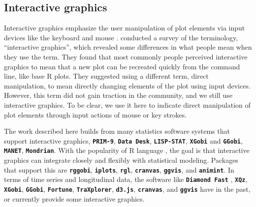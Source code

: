 \documentclass[12pt]{article}
\begin{document}
\begin{enumerate}
\end{enumerate}

\subsection{Interactive graphics\label{sec:interactive-graphics}}

Interactive graphics emphasize the user manipulation of plot elements via input devices like the keyboard and mouse \citep{symanzik2012interactive}. \citet{swayne1999} conducted a survey of the terminology, ``interactive graphics'', which revealed some differences in what people mean when they use the term. They found that most commonly people perceived interactive graphics to mean that a new plot can be recreated quickly from the command line, like base R plots. They suggested using a different term, direct manipulation, to mean directly changing elements of the plot using input devices. However, this term did not gain traction in the community, and we still use interactive graphics. To be clear, we use it here to indicate direct manipulation of plot elements through input actions of mouse or key strokes. 

The work described here builds from many statistics software systems that support interactive graphics, 
\texttt{\textbf{PRIM-9}}\citep{fisherkeller1988prim},
\texttt{\textbf{Data Desk}}\citep{velleman1988datadesk},
\texttt{\textbf{LISP-STAT}}\citep{tierney1990lisp},
\texttt{\textbf{XGobi}}\citep{swayne1998xgobi} and
\texttt{\textbf{GGobi}}\citep{cook2007ggobi},
\texttt{\textbf{MANET}}\citep{unwin1996manet},
\texttt{\textbf{Mondrian}}\citep{theus2002mondrian}.
With the popularity of R language \citep{Rlanguage},
the goal is that interactive graphics can
integrate closely and flexibly with statistical modeling.
Packages that support this are \texttt{\textbf{rggobi}}\citep{rggobi},
\texttt{\textbf{iplots}}\citep{iplots},
\texttt{\textbf{rgl}}\citep{adler2003rgl},
\texttt{\textbf{cranvas}}\citep{cranvas},
\texttt{\textbf{ggvis}}\citep{ggvis},
and \texttt{\textbf{animint}}\citep{animint}. In terms of
time series and longitudinal data, the software like
\texttt{\textbf{Diamond Fast}} \citep{unwin1988eyeballing},
\texttt{\textbf{XQz}}\citep{McDougall1994},
\texttt{\textbf{XGobi}}, \texttt{\textbf{GGobi}},
\texttt{\textbf{Fortune}}\citep{kotterfortune},
\texttt{\textbf{TraXplorer}}\citep{Javed2010},
\texttt{\textbf{d3.js}}\citep{bostock2012data},
\texttt{\textbf{cranvas}}, and \texttt{\textbf{ggvis}}
have in the past, or currently provide some interactive graphics.
\end{document}
